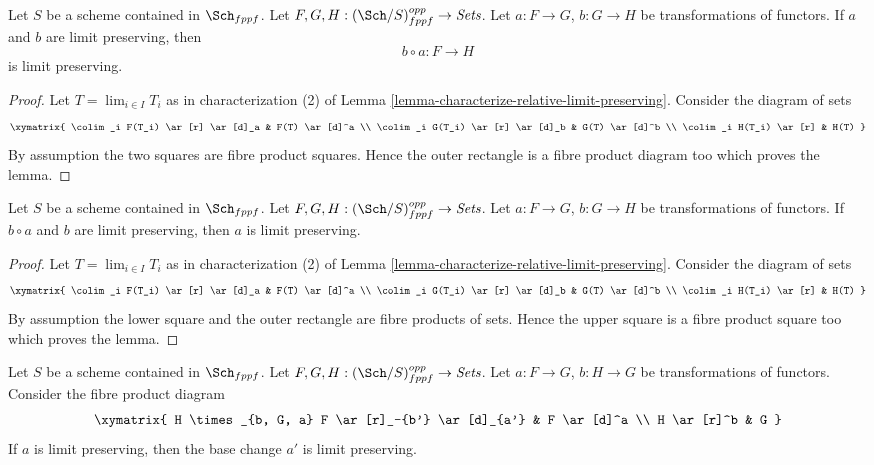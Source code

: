 \begin{lemma}
\label{lemma-composition-locally-finite-presentation}
Let $S$ be a scheme contained in $\Sch_{fppf}$.
Let $F, G, H : (\Sch/S)_{fppf}^{opp} \to \textit{Sets}$.
Let $a : F \to G$, $b : G \to H$ be transformations of functors.
If $a$ and $b$ are limit preserving, then
$$
b \circ a : F \longrightarrow H
$$
is limit preserving.
\end{lemma}

\begin{proof}
Let $T = \lim_{i \in I} T_i$ as in characterization (2) of
Lemma \ref{lemma-characterize-relative-limit-preserving}.
Consider the diagram of sets
$$
\xymatrix{
\colim_i F(T_i) \ar[r] \ar[d]_a & F(T) \ar[d]^a \\
\colim_i G(T_i) \ar[r] \ar[d]_b & G(T) \ar[d]^b \\
\colim_i H(T_i) \ar[r] & H(T)
}
$$
By assumption the two squares are fibre product squares. Hence the
outer rectangle is a fibre product diagram too which proves the lemma.
\end{proof}

\begin{lemma}
\label{lemma-locally-finite-presentation-permanence}
Let $S$ be a scheme contained in $\Sch_{fppf}$.
Let $F, G, H : (\Sch/S)_{fppf}^{opp} \to \textit{Sets}$.
Let $a : F \to G$, $b : G \to H$ be transformations of functors.
If $b \circ a$ and $b$ are limit preserving, then $a$
is limit preserving.
\end{lemma}

\begin{proof}
Let $T = \lim_{i \in I} T_i$ as in characterization (2) of
Lemma \ref{lemma-characterize-relative-limit-preserving}.
Consider the diagram of sets
$$
\xymatrix{
\colim_i F(T_i) \ar[r] \ar[d]_a & F(T) \ar[d]^a \\
\colim_i G(T_i) \ar[r] \ar[d]_b & G(T) \ar[d]^b \\
\colim_i H(T_i) \ar[r] & H(T)
}
$$
By assumption the lower square and the outer rectangle
are fibre products of sets. Hence the upper square
is a fibre product square too which proves the lemma.
\end{proof}

\begin{lemma}
\label{lemma-base-change-locally-finite-presentation}
Let $S$ be a scheme contained in $\Sch_{fppf}$.
Let $F, G, H : (\Sch/S)_{fppf}^{opp} \to \textit{Sets}$.
Let $a : F \to G$, $b : H \to G$ be transformations of functors.
Consider the fibre product diagram
$$
\xymatrix{
H \times_{b, G, a} F \ar[r]_-{b'} \ar[d]_{a'} & F \ar[d]^a \\
H \ar[r]^b & G
}
$$
If $a$ is limit preserving, then the base change $a'$ is limit preserving.
\end{lemma}

